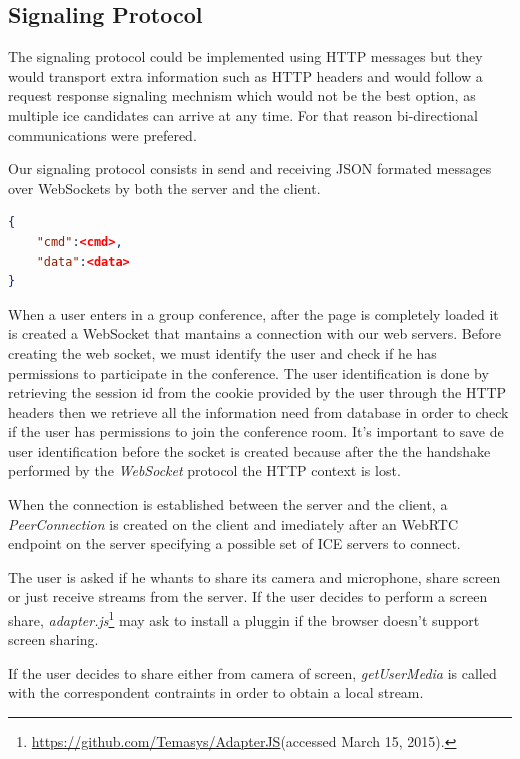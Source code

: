 \subsection{Signaling Protocol}

The signaling protocol could be implemented using \ac{HTTP} messages but they would transport extra information such as \ac{HTTP} headers and would follow a request response signaling mechnism which would not be the best option, as multiple ice candidates can arrive at any time. For that reason bi-directional communications were prefered.

Our signaling protocol consists in send and receiving JSON formated messages over WebSockets by both the server and the client. 

\begin{lstlisting}[caption={General structure of our WebSocket messages},language=json]
{
	"cmd":<cmd>,
	"data":<data>
}
\end{lstlisting}

When a user enters in a group conference, after the page is completely loaded it is created a WebSocket that mantains a connection with our web servers. 
Before creating the web socket, we must identify the user and check if he has permissions to participate in the conference. The user identification is done by retrieving the session id from the cookie provided by the user through the \ac{HTTP} headers then we retrieve all the information need from database in order to check if the user has permissions to join the conference room. It's important to save de user identification before the socket is created because after the the handshake performed by the \emph{WebSocket} protocol\cite{rfc6455} the \ac{HTTP} context is lost.

When the connection is established between the server and the client, a \emph{PeerConnection} is created on the client and imediately after an \ac{WebRTC} endpoint on the server specifying a possible set of \ac{ICE} servers to connect.

The user is asked if he whants to share its camera and microphone, share screen or just receive streams from the server. If the user decides to perform a screen share, \emph{adapter.js}\footnote{\url{https://github.com/Temasys/AdapterJS}(accessed March 15, 2015).} may ask to install a pluggin if the browser doesn't support screen sharing.

If the user decides to share either from camera of screen, \emph{getUserMedia} is called with the correspondent contraints in order to obtain a local stream. 

